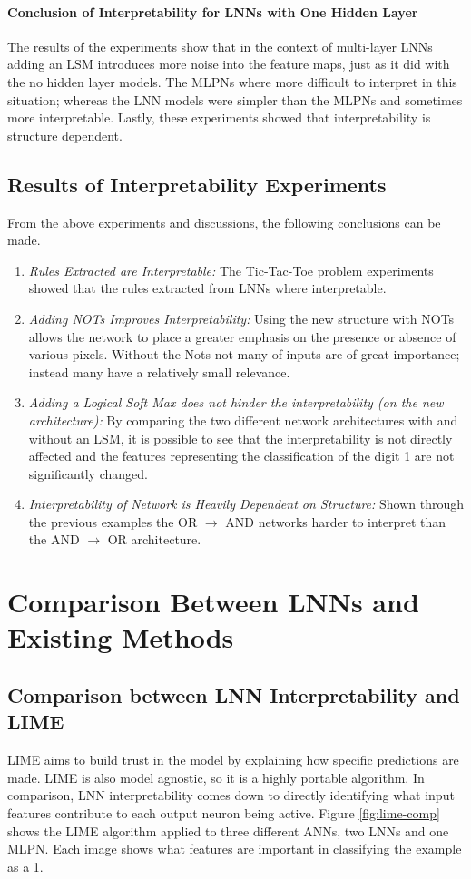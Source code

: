 \paragraph{Conclusion of Interpretability for LNNs with One Hidden Layer}
	The results of the experiments show that in the context of multi-layer LNNs adding an LSM introduces more noise into the feature maps, just as it did with the no hidden layer models. The MLPNs where more difficult to interpret in this situation; whereas the LNN models were simpler than the MLPNs and sometimes more interpretable. Lastly, these experiments showed that interpretability is structure dependent.

\subsection{Results of Interpretability Experiments}
From the above experiments and discussions, the following conclusions can be made.

\begin{enumerate}
	\item \textit{Rules Extracted are Interpretable:} The Tic-Tac-Toe problem experiments showed that the rules extracted from LNNs where interpretable.
	\item \textit{Adding NOTs Improves Interpretability:} Using the new structure with NOTs allows the network to place a greater emphasis on the presence or absence of various pixels. Without the Nots not many of inputs are of great importance; instead many have a relatively small relevance.
	\item \textit{Adding a Logical Soft Max does not hinder the interpretability (on the new architecture):} By comparing the two different network architectures with and without an LSM, it is possible to see that the interpretability is not directly affected and the features representing the classification of the digit 1 are not significantly changed.
	\item \textit{Interpretability of Network is Heavily Dependent on Structure:} Shown through the previous examples the OR $\rightarrow$ AND networks harder to interpret than the AND $\rightarrow$ OR architecture.
\end{enumerate}

\section{Comparison Between LNNs and Existing Methods}
\subsection{Comparison between LNN Interpretability and LIME}
LIME aims to build trust in the model by explaining how specific predictions are made. LIME is also model agnostic, so it is a highly portable algorithm.  In comparison, LNN interpretability comes down to directly identifying what input features contribute to each output neuron being active. Figure \ref{fig:lime-comp} shows the LIME algorithm applied to three different ANNs, two LNNs and one MLPN. Each image shows what features are important in classifying the example as a 1.

